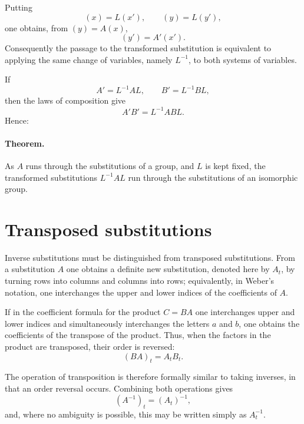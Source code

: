 \documentclass[11pt]{article}
\begin{document}
Putting
\begin{equation}\label{eq:weber8-variable-transform}
(x)=L(x'),\qquad (y)=L(y'),
\end{equation}
one obtains, from $(y)=A(x)$,
\begin{equation}\label{eq:weber8-transformed-action}
(y')=A'(x').
\end{equation}
Consequently the passage to the transformed substitution is equivalent to applying the same change of variables, namely $L^{-1}$, to both systems of variables.

If
\[
A'=L^{-1}AL,
\qquad
B'=L^{-1}BL,
\]
then the laws of composition give
\[
A'B'=L^{-1}ABL.
\]
Hence:

\paragraph{Theorem.} As $A$ runs through the substitutions of a group, and $L$ is kept fixed, the transformed substitutions $L^{-1}AL$ run through the substitutions of an isomorphic group.

\section*{Transposed substitutions}
Inverse substitutions must be distinguished from transposed substitutions.  From a substitution $A$ one obtains a definite new substitution, denoted here by $A_t$, by turning rows into columns and columns into rows; equivalently, in Weber's notation, one interchanges the upper and lower indices of the coefficients of $A$.

If in the coefficient formula for the product $C=BA$ one interchanges upper and lower indices and simultaneously interchanges the letters $a$ and $b$, one obtains the coefficients of the transpose of the product.  Thus, when the factors in the product are transposed, their order is reversed:
\begin{equation}\label{eq:weber8-transpose-product}
(BA)_t=A_tB_t.
\end{equation}

The operation of transposition is therefore formally similar to taking inverses, in that an order reversal occurs.  Combining both operations gives
\begin{equation}\label{eq:weber8-inverse-transpose}
(A^{-1})_t=(A_t)^{-1},
\end{equation}
and, where no ambiguity is possible, this may be written simply as $A_t^{-1}$.
\end{document}
